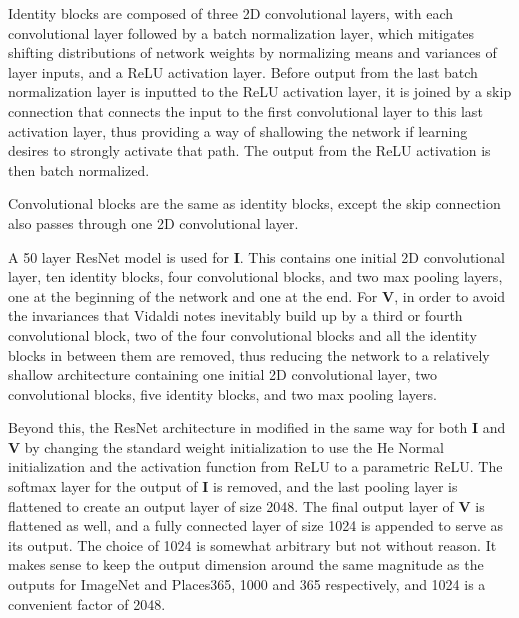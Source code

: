 Identity blocks are composed of three 2D convolutional layers, with each convolutional layer followed by a batch normalization layer, which mitigates shifting distributions of network weights by normalizing means and variances of layer inputs, and a ReLU activation layer. Before output from the last batch normalization layer is inputted to the ReLU activation layer, it is joined by a skip connection that connects the input to the first convolutional layer to this last activation layer, thus providing a way of shallowing the network if learning desires to strongly activate that path. The output from the ReLU activation is then batch normalized.

Convolutional blocks are the same as identity blocks, except the skip connection also passes through one 2D convolutional layer.

A 50 layer ResNet model is used for $\mathbf{I}$. This contains one initial 2D convolutional layer, ten identity blocks, four convolutional blocks, and two max pooling layers, one at the beginning of the network and one at the end. For $\mathbf{V}$, in order to avoid the invariances that Vidaldi notes inevitably build up by a third or fourth convolutional block, two of the four convolutional blocks and all the identity blocks in between them are removed, thus reducing the network to a relatively shallow architecture containing one initial 2D convolutional layer, two convolutional blocks, five identity blocks, and two max pooling layers.

Beyond this, the ResNet architecture in modified in the same way for both $\mathbf{I}$ and $\mathbf{V}$ by changing the standard weight initialization to use the He Normal initialization and the activation function from ReLU to a parametric ReLU. The softmax layer for the output of $\mathbf{I}$ is removed, and the last pooling layer is flattened to create an output layer of size 2048. The final output layer of $\mathbf{V}$ is flattened as well, and a fully connected layer of size 1024 is appended to serve as its output. The choice of 1024 is somewhat arbitrary but not without reason. It makes sense to keep the output dimension around the same magnitude as the outputs for ImageNet and Places365, 1000 and 365 respectively, and 1024 is a convenient factor of 2048.


